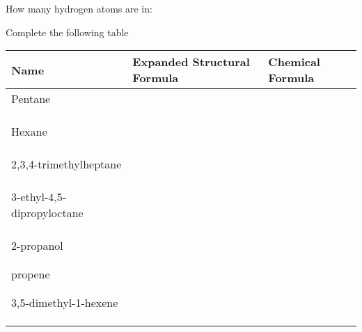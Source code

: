 \documentclass[addpoints, 12pt]{exam}
\begin{document}
\begin{questions}

\question[15] How many hydrogen atoms are in:

\question[25] Complete the following table

\begin{tabular}{l|l|l}
Name & Expanded Structural Formula & Chemical Formula \\
\hline
Pentane & & \\
 & & \\
 & & \\
 & & \\
\hline
Hexane & & \\
& & \\ & & \\ & & \\ \hline
2,3,4-trimethylheptane & & \\
& & \\ & & \\ & & \\ \hline
3-ethyl-4,5-dipropyloctane & & \\
& & \\ & & \\ & & \\ \hline
2-propanol
& & \\ & & \\ & & \\ \hline
propene
& & \\ & & \\ & & \\ \hline
3,5-dimethyl-1-hexene & & \\
& & \\ & & \\ & & \\ \hline
\end{tabular}



\end{questions}
\end{document}
